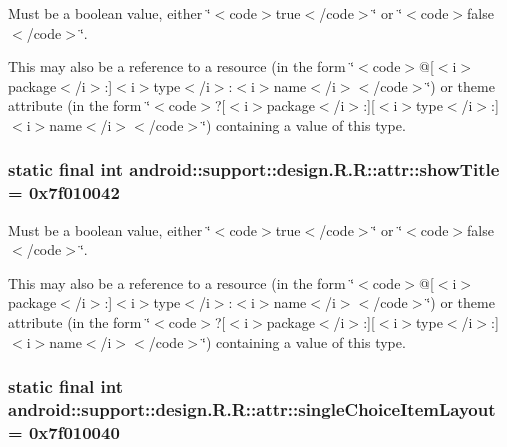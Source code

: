 Must be a boolean value, either \char`\"{}$<$code$>$true$<$/code$>$\char`\"{} or \char`\"{}$<$code$>$false$<$/code$>$\char`\"{}. 

This may also be a reference to a resource (in the form \char`\"{}$<$code$>$@\mbox{[}$<$i$>$package$<$/i$>$:\mbox{]}$<$i$>$type$<$/i$>$:$<$i$>$name$<$/i$>$$<$/code$>$\char`\"{}) or theme attribute (in the form \char`\"{}$<$code$>$?\mbox{[}$<$i$>$package$<$/i$>$:\mbox{]}\mbox{[}$<$i$>$type$<$/i$>$:\mbox{]}$<$i$>$name$<$/i$>$$<$/code$>$\char`\"{}) containing a value of this type. \hypertarget{classandroid_1_1support_1_1design_1_1_r_1_1attr_bec6a31a18daa12e78dd764cc1c1f7d4}{
\subsubsection[{showTitle}]{\setlength{\rightskip}{0pt plus 5cm}static final int android::support::design.R.R::attr::showTitle = 0x7f010042}}
\label{classandroid_1_1support_1_1design_1_1_r_1_1attr_bec6a31a18daa12e78dd764cc1c1f7d4}


Must be a boolean value, either \char`\"{}$<$code$>$true$<$/code$>$\char`\"{} or \char`\"{}$<$code$>$false$<$/code$>$\char`\"{}. 

This may also be a reference to a resource (in the form \char`\"{}$<$code$>$@\mbox{[}$<$i$>$package$<$/i$>$:\mbox{]}$<$i$>$type$<$/i$>$:$<$i$>$name$<$/i$>$$<$/code$>$\char`\"{}) or theme attribute (in the form \char`\"{}$<$code$>$?\mbox{[}$<$i$>$package$<$/i$>$:\mbox{]}\mbox{[}$<$i$>$type$<$/i$>$:\mbox{]}$<$i$>$name$<$/i$>$$<$/code$>$\char`\"{}) containing a value of this type. \hypertarget{classandroid_1_1support_1_1design_1_1_r_1_1attr_bbd5cda75e9a09f28672b2825d36bda1}{
\subsubsection[{singleChoiceItemLayout}]{\setlength{\rightskip}{0pt plus 5cm}static final int android::support::design.R.R::attr::singleChoiceItemLayout = 0x7f010040}}
\label{classandroid_1_1support_1_1design_1_1_r_1_1attr_bbd5cda75e9a09f28672b2825d36bda1}


